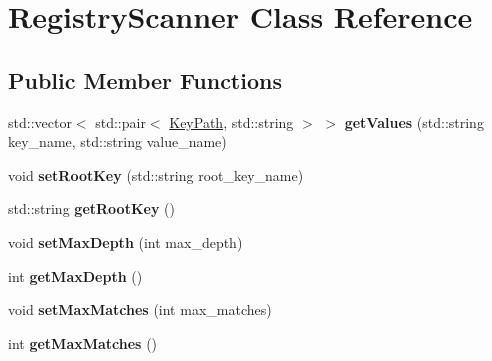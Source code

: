 \hypertarget{class_registry_scanner}{}\section{Registry\+Scanner Class Reference}
\label{class_registry_scanner}
\subsection*{Public Member Functions}
\begin{DoxyCompactItemize}
\item 
\hypertarget{class_registry_scanner_a5a576a5caf8f03054ec1d66f97a507a3}{}std\+::vector$<$ std\+::pair$<$ \hyperlink{class_key_path}{Key\+Path}, std\+::string $>$ $>$ {\bfseries get\+Values} (std\+::string key\+\_\+name, std\+::string value\+\_\+name)\label{class_registry_scanner_a5a576a5caf8f03054ec1d66f97a507a3}

\item 
\hypertarget{class_registry_scanner_ab7a22643837934c1316038ac0fbd0f90}{}void {\bfseries set\+Root\+Key} (std\+::string root\+\_\+key\+\_\+name)\label{class_registry_scanner_ab7a22643837934c1316038ac0fbd0f90}

\item 
\hypertarget{class_registry_scanner_a5e934823c10e5d29ed223b5bc9c5145d}{}std\+::string {\bfseries get\+Root\+Key} ()\label{class_registry_scanner_a5e934823c10e5d29ed223b5bc9c5145d}

\item 
\hypertarget{class_registry_scanner_a31927ff653af4ae74d2bc8edd3c322f8}{}void {\bfseries set\+Max\+Depth} (int max\+\_\+depth)\label{class_registry_scanner_a31927ff653af4ae74d2bc8edd3c322f8}

\item 
\hypertarget{class_registry_scanner_aca1a71138cd3b330822bdf217407ead7}{}int {\bfseries get\+Max\+Depth} ()\label{class_registry_scanner_aca1a71138cd3b330822bdf217407ead7}

\item 
\hypertarget{class_registry_scanner_a0e456e336f9f6c1f4ab54b43754168ff}{}void {\bfseries set\+Max\+Matches} (int max\+\_\+matches)\label{class_registry_scanner_a0e456e336f9f6c1f4ab54b43754168ff}

\item 
\hypertarget{class_registry_scanner_a3712b5c6cffd7b2c7426361124d63acc}{}int {\bfseries get\+Max\+Matches} ()\label{class_registry_scanner_a3712b5c6cffd7b2c7426361124d63acc}

\end{DoxyCompactItemize}
